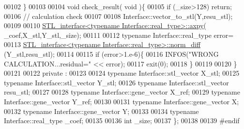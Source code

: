 \begin{DoxyCode}
00102   \}
00103 
00104   \textcolor{keywordtype}{void} check\_result( \textcolor{keywordtype}{void} )\{
00105     \textcolor{keywordflow}{if} (\_size>128) \textcolor{keywordflow}{return};
00106     \textcolor{comment}{// calculation check}
00107 
00108     Interface::vector\_to\_stl(Y,resu\_stl);
00109 
00110     \hyperlink{class_s_t_l__interface}{STL\_interface<typename Interface::real\_type>::axpy}(
      \_coef,X\_stl,Y\_stl,\_size);
00111 
00112     \textcolor{keyword}{typename} Interface::real\_type error=
00113       \hyperlink{class_s_t_l__interface}{STL\_interface<typename Interface::real\_type>::norm\_diff}
      (Y\_stl,resu\_stl);
00114 
00115     \textcolor{keywordflow}{if} (error>1.e-6)\{
00116       INFOS(\textcolor{stringliteral}{"WRONG CALCULATION...residual="} << error);
00117       exit(0);
00118     \}
00119 
00120   \}
00121 
00122 private :
00123 
00124   \textcolor{keyword}{typename} Interface::stl\_vector X\_stl;
00125   \textcolor{keyword}{typename} Interface::stl\_vector Y\_stl;
00126   \textcolor{keyword}{typename} Interface::stl\_vector resu\_stl;
00127 
00128   \textcolor{keyword}{typename} Interface::gene\_vector X\_ref;
00129   \textcolor{keyword}{typename} Interface::gene\_vector Y\_ref;
00130 
00131   \textcolor{keyword}{typename} Interface::gene\_vector X;
00132   \textcolor{keyword}{typename} Interface::gene\_vector Y;
00133 
00134   \textcolor{keyword}{typename} Interface::real\_type \_coef;
00135 
00136   \textcolor{keywordtype}{int} \_size;
00137 \};
00138 
00139 \textcolor{preprocessor}{#endif}
\end{DoxyCode}
